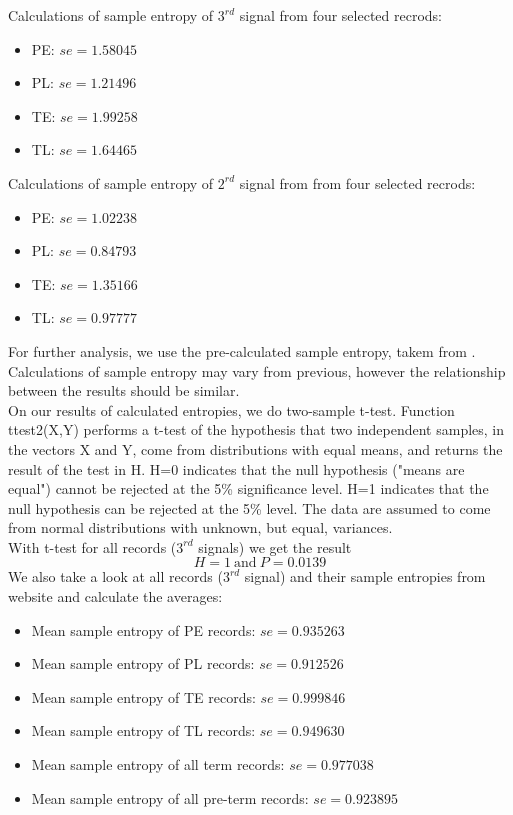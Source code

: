 \documentclass[a4paper,11pt]{article}
\begin{document}
\noindent
Calculations of sample entropy of $3^{rd}$ signal from four selected recrods:
\begin{itemize}
    \item PE: $se = 1.58045$
    \item PL: $se = 1.21496$
    \item TE: $se = 1.99258$
    \item TL: $se = 1.64465$
\end{itemize}
Calculations of sample entropy of $2^{rd}$ signal from from four selected recrods:
\begin{itemize}
    \item PE: $se = 1.02238$
    \item PL: $se = 0.84793$
    \item TE: $se = 1.35166$
    \item TL: $se = 0.97777$
\end{itemize}
\noindent
For further analysis, we use the pre-calculated sample entropy, takem from \cite{bib:net}. 
Calculations of sample entropy may vary from previous, however the relationship between the results should be similar. 
\\
\noindent
On our results of calculated entropies, we do two-sample t-test. Function ttest2(X,Y) performs a t-test of the hypothesis that two
independent samples, in the vectors X and Y, come from distributions
with equal means, and returns the result of the test in H.  H=0
indicates that the null hypothesis ("means are equal") cannot be
rejected at the 5\% significance level.  H=1 indicates that the null
hypothesis can be rejected at the 5\% level.  The data are assumed to
come from normal distributions with unknown, but equal, variances.
\\
With t-test for all records ($3^{rd}$ signals) we get the result 
$$ H = 1 \ \text{and} \ P = 0.0139 $$
We also take a look at all records ($3^{rd}$ signal) and their sample entropies from website \cite{bib:fisio} and calculate the averages:
\begin{itemize}
    \item Mean sample entropy of PE records: $se = 0.935263$
    \item Mean sample entropy of PL records: $se = 0.912526$
    \item Mean sample entropy of TE records: $se = 0.999846$
    \item Mean sample entropy of TL records: $se = 0.949630$
    \item Mean sample entropy of all term records: $se = 0.977038$
    \item Mean sample entropy of all pre-term records: $se = 0.923895$
\end{itemize}
\end{document}
